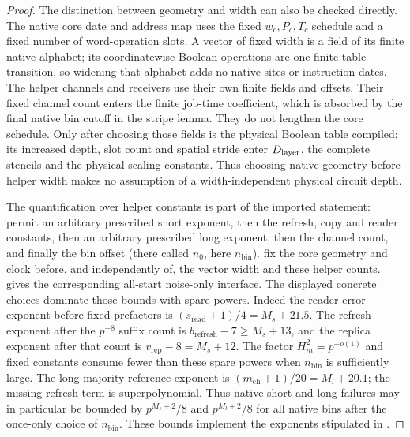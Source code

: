 \begin{proof}
The distinction between geometry and width can also be checked directly. The native core date and address map uses the fixed \(w_c,P_c,T_c\) schedule and a fixed number of word-operation slots. A vector of fixed width is a field of its finite native alphabet; its coordinatewise Boolean operations are one finite-table transition, so widening that alphabet adds no native sites or instruction dates. The helper channels and receivers use their own finite fields and offsets. Their fixed channel count enters the finite job-time coefficient, which is absorbed by the final native bin cutoff in the stripe lemma. They do not lengthen the core schedule. Only after choosing those fields is the physical Boolean table compiled; its increased depth, slot count and spatial stride enter \(D_{\rm layer}\), the complete stencils and the physical scaling constants. Thus choosing native geometry before helper width makes no assumption of a width-independent physical circuit depth.

The quantification over helper constants is part of the imported statement: \cite[Lemma~\ref*{cl:lem:stripes}, its proof and Appendix~\ref*{cl:sec:constants}]{DMNoise1D2026} permit an arbitrary prescribed short exponent, then the refresh, copy and reader constants, then an arbitrary prescribed long exponent, then the channel count, and finally the bin offset (there called \(n_0\), here \(n_{\mathrm{bin}}\)). \cite[Sections~\ref*{cl:sec:parameter} and~\ref*{cl:sec:stripes}, and Lemma~\ref*{cl:lem:joint}]{DMNoise1D2026} fix the core geometry and clock before, and independently of, the vector width and these helper counts. \cite[Lemma~\ref*{cl:lem:stripes}]{DMNoise1D2026} gives the corresponding all-start noise-only interface. The displayed concrete choices dominate those bounds with spare powers. Indeed the reader error exponent before fixed prefactors is \((s_{\mathrm{read}}+1)/4=M_{s}+21.5\). The refresh exponent after the \(p^{-8}\) suffix count is \(b_{\mathrm{refresh}}-7\ge M_{s}+13\), and the replica exponent after that count is \(v_{\mathrm{rep}}-8=M_{s}+12\). The factor \(H_{m}^{2}=p^{-o(1)}\) and fixed constants consume fewer than these spare powers when \(n_{\mathrm{bin}}\) is sufficiently large. The long majority-reference exponent is \((m_{\mathrm{ch}}+1)/20=M_{l}+20.1\); the missing-refresh term is superpolynomial. Thus native short and long failures may in particular be bounded by \(p^{M_{s}+2}/8\) and \(p^{M_{l}+2}/8\) for all native bins after the once-only choice of \(n_{\mathrm{bin}}\). These bounds implement the exponents stipulated in \cite[Lemma~\ref*{cl:lem:stripes}]{DMNoise1D2026}.


\end{proof}
